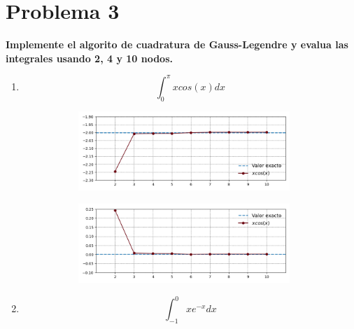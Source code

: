 \section*{Problema 3}

\textbf{Implemente el algorito de cuadratura de Gauss-Legendre y evalua las integrales usando 2, 4 y 10 nodos.}

\begin{enumerate}
    \item \begin{equation*}
              \int_0^\pi xcos(x) dx
          \end{equation*}

          \begin{figure}[H]
            \centering
            \begin{subfigure}[b]{8cm}
                \includegraphics[width=8cm]{Graphics/problema03_fun_f1.png}
                \caption{}
            \end{subfigure}
            \begin{subfigure}[b]{8cm}
                \includegraphics[width=8cm]{Graphics/problema03_diff_f1.png}
                \caption{}
            \end{subfigure}
            \caption{}
        \end{figure}

    \item \begin{equation*}
              \int_{-1}^0 xe^{-x} dx
          \end{equation*}


\end{enumerate}
